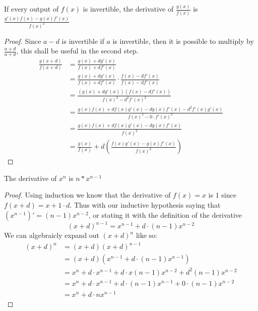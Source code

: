 \begin{theorem}
  If every output of $f(x)$ is invertible, the derivative of $\frac{g(x)}{f(x)}$ is $\frac{g'(x)f(x)-g(x)f'(x)}{f(x)^2}$
\end{theorem}
\begin{proof}
  Since $a-d$ is invertible if $a$ is invertible, then it is possible to multiply by $\frac{a+d}{a+d}$, this shall be useful in the second step.
  \begin{align*}
    \frac{g(x+d)}{f(x+d)}&=\frac{g(x)+dg'(x)}{f(x)+df'(x)}\\
    &=\frac{g(x)+dg'(x)}{f(x)+df'(x)}\cdot\frac{f(x)-df'(x)}{f(x)-df'(x)} \\
    &=\frac{(g(x)+dg'(x))(f(x)-df'(x))}{f(x)^2-d^2f'(x)^2}\\
    &=\frac{g(x)f(x)+df(x)g'(x)-dg(x)f'(x)-d^2f'(x)g'(x)}{f(x)^2-0\cdot f'(x)^2}\\
    &=\frac{g(x)f(x)+df(x)g'(x)-dg(x)f'(x)}{f(x)^2}\\
    &=\frac{g(x)}{f(x)}+d\left(\frac{f(x)g'(x)-g(x)f'(x)}{f(x)^2}\right)
  \end{align*}
  
\end{proof}

\begin{theorem}
  The derivative of $x^n$ is $n*x^{n-1}$
\end{theorem}
\begin{proof}
  Using induction we know that the derivative of $f(x)=x$ is $1$ since $f(x+d)=x+1 \cdot d$. Thus with our inductive hypothesis saying that $(x^{n-1})'=(n-1)x^{n-2}$, or stating it with the definition of the derivative
  \begin{equation*}
    (x+d)^{n-1}=x^{n-1}+d\cdot (n-1)x^{n-2}
  \end{equation*}
  We can algebraicly expand out $(x+d)^n$ like so:
  \begin{align*}
    (x+d)^n&=(x+d)(x+d)^{n-1}\\
    &=(x+d)\left(x^{n-1}+d\cdot (n-1)x^{n-1}\right)\\
    &=x^n+d\cdot x^{n-1}+d\cdot x(n-1)x^{n-2}+d^2 (n-1)x^{n-2}\\
    &=x^n+d\cdot x^{n-1}+d\cdot (n-1)x^{n-1}+0\cdot(n-1)x^{n-2}\\
    &=x^n+d\cdot nx^{n-1}
  \end{align*}
\end{proof}

